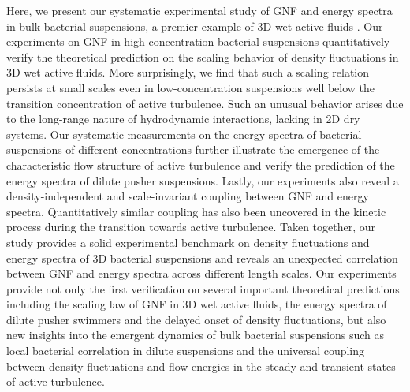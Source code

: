 \documentclass[twocolumn,aps,prx,amsmath,amssymb,longbibliography]{revtex4-2}
\begin{document}
Here, we present our systematic experimental study of GNF and energy spectra in bulk bacterial suspensions, a premier example of 3D wet active fluids \cite{Marchetti2013}. Our experiments on GNF in high-concentration bacterial suspensions quantitatively verify the theoretical prediction on the scaling behavior of density fluctuations in 3D wet active fluids. More surprisingly, we find that such a scaling relation persists at small scales even in low-concentration suspensions well below the transition concentration of active turbulence. Such an unusual behavior arises due to the long-range nature of hydrodynamic interactions, lacking in 2D dry systems. Our systematic measurements on the energy spectra of bacterial suspensions of different concentrations further illustrate the emergence of the characteristic flow structure of active turbulence and verify the prediction of the energy spectra of dilute pusher suspensions. Lastly, our experiments also reveal a density-independent and scale-invariant coupling between GNF and energy spectra. Quantitatively similar coupling has also been uncovered in the kinetic process during the transition towards active turbulence. Taken together, our study provides a solid experimental benchmark on density fluctuations and energy spectra of 3D bacterial suspensions and reveals an unexpected correlation between GNF and energy spectra across different length scales. Our experiments provide not only the first verification on several important theoretical predictions including the scaling law of GNF in 3D wet active fluids, the energy spectra of dilute pusher swimmers and the delayed onset of density fluctuations, but also new insights into the emergent dynamics of bulk bacterial suspensions such as local bacterial correlation in dilute suspensions and the universal coupling between density fluctuations and flow energies in the steady and transient states of active turbulence.
\end{document}
